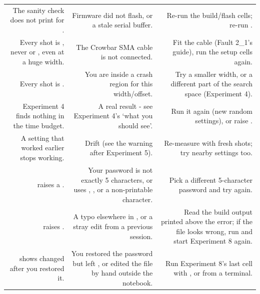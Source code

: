 \documentclass[11pt,letterpaper]{article}
\begin{document}
{\small{}
\begin{longtable}{|R{0.2899}|R{0.3043}|R{0.4058}|}
\hline
{} &  &  \\ \hline
\endhead
The sanity check does not print  for . & Firmware did not flash, or a stale serial buffer. & Re-run the build/flash cells; re-run . \\ \hline
Every shot is , never  or , even at a huge width. & The Crowbar SMA cable is not connected. & Fit the cable (Fault 2\_1's guide), run the setup cells again. \\ \hline
Every shot is . & You are inside a crash region for this width/offset. & Try a smaller width, or a different part of the search space (Experiment 4). \\ \hline
Experiment 4 finds nothing in the time budget. & A real result - see Experiment 4's `what you should see'. & Run it again (new random settings), or raise . \\ \hline
A setting that worked earlier stops working. & Drift (see the warning after Experiment 5). & Re-measure with fresh shots; try nearby settings too. \\ \hline
{} raises a . & Your password is not exactly 5 characters, or uses \codesmall{\textquotedbl{}}, \codesmall{\textbackslash{}}, or a non-printable character. & Pick a different 5-character password and try again. \\ \hline
{} raises . & A typo elsewhere in , or a stray edit from a previous session. & Read the build output printed above the error; if the file looks wrong, run  and start Experiment 8 again. \\ \hline
{} shows  changed after you restored it. & You restored the password but left , or edited the file by hand outside the notebook. & Run Experiment 8's last cell with , or  from a terminal. \\ \hline

\end{longtable}}
\end{document}
